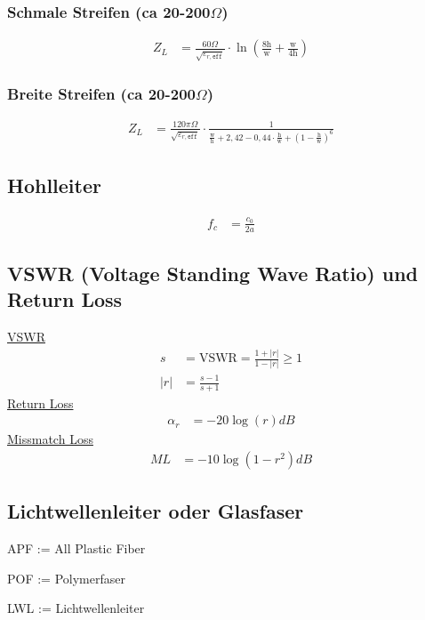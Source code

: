 \subsubsection[Schmale Streifen]{Schmale Streifen (ca 20-200$\Omega$)}
\begin{align*}
    Z_L & = \frac{60\Omega}{\sqrt{\varepsilon_{r,\texttt{eff}}}}\cdot\ln\left(\frac{8\text{h}}{\text{w}}+\frac{\mathrm{w}}{4\mathrm{h}}\right)
\end{align*}
\subsubsection[Breite Streifen]{Breite Streifen (ca 20-200$\Omega$)}
\begin{align*}
    Z_L & = \frac{120\pi\Omega}{\sqrt{\varepsilon_{r,\texttt{eff}}}}\cdot\frac{1}{\frac{\text{w}}{\text{h}}+2,42-0,44\cdot\frac{\mathrm{h}}{\mathrm{w}}+\left(1-\frac{\mathrm{h}}{\mathrm{w}}\right)^6}
\end{align*}

\subsection{Hohlleiter}
\begin{align*}
    f_c & = \frac{c_0}{2a}
\end{align*}

\subsection{VSWR (Voltage Standing Wave Ratio) und Return Loss}
\underline{VSWR}
\begin{align*}
    s   & = \mathrm{VSWR} = \frac{1+|r|}{1-|r|}\geq 1 \\
    |r| & = \frac{s-1}{s+1} 
\end{align*}
\underline{Return Loss}
\begin{align*}
    \alpha_r & = -20\log(r)dB
\end{align*}
\underline{Missmatch Loss}
\begin{align*}
    ML & = -10\log(1-r^2)dB
\end{align*}
\subsection{Lichtwellenleiter oder Glasfaser}
APF := All Plastic Fiber

POF := Polymerfaser

LWL := Lichtwellenleiter 

